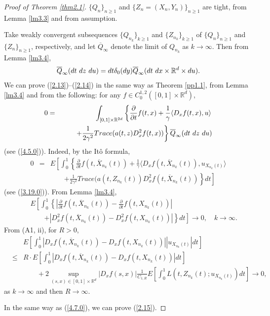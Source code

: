 \documentclass[12pt]{article}
\begin{document}
\begin{proof}[Proof of Theorem \ref{thm2.1}]
$\{Q_n\}_{n\ge 1}$ and $\{Z_n=(X_n, Y_n)\}_{n\ge 1}$ are tight,
from Lemma \ref{lm3.3} and  from assumption.


Take weakly convergent subsequences 
$\{Q_{n_k}\}_{k\ge 1}$ and 
$\{Z_{n_k}\}_{k\ge 1}$
of $\{Q_n \}_{n\ge 1}$ and $\{Z_n\}_{n\ge 1}$, respectively, and let $\overline Q_\infty$ denote the limit of $Q_{n_k} $ as $k\to\infty$.
Then from Lemma \ref{lm3.4},
\begin{equation}
\overline Q_\infty(dt\hbox{ }dz\hbox{ }du)=dt\delta_0(dy)\overline Q_\infty(dt\hbox{ }dx\times \mathbb{R}^d \times du).
\end{equation}
We can prove (\ref{2.13})--(\ref{2.14}) in the same way as Theorem \ref{pp1.1},
from Lemma \ref{lm3.4} and from the following:
for any $f\in C_0^{1,2}([0,1]\times \mathbb{R}^{d})$, 
\begin{eqnarray}\label{4.7}
0&=&\int_{[0,1]\times \mathbb{R}^{2d}} \left\{
\frac{\partial }{\partial t}f(t, x)+
\frac{1}{\gamma}\langle D_x f(t, x),u\rangle\right.\\
&&\qquad \left.
+\frac{1}{2\gamma^2}Trace (a(t, z)D_x^2f(t, x))\right\}
\overline Q_\infty(dt\hbox{ }dz\hbox{ }du)\nonumber
\end{eqnarray}
(see (\ref{4.5.0})).
Indeed,  by the It\^o formula, 
\begin{eqnarray}%
0&=&E\left[\int_0^1 \left\{
\frac{\partial }{\partial t}f(t, \overline X_{n_k}(t))+
\frac{1}{\gamma}\langle D_x f(t, \overline X_{n_k}(t)),u_{X_{n_k}(t)}\rangle\right.\right.\nonumber\\
&&\qquad\left.\left.+\frac{1}{2\gamma^2}Trace (a(t, Z_{n_k}(t))D_x^2f(t, \overline X_{n_k}(t))\right\}dt\right]\nonumber
\end{eqnarray}
(see (\ref{3.19.0})).
From Lemma \ref{lm3.4}, %
\begin{eqnarray}\label{4.10}
&&E\left[\int_0^1 \left\{
\left|\frac{\partial }{\partial t}f(t, \overline X_{n_k}(t)) -\frac{\partial }{\partial t}f(t,X_{n_k}(t))\right|
\right.\right.\\
&&\qquad \left.\left.
+\left|D_x^2f(t, \overline X_{n_k}(t))-D_x^2f(t, X_{n_k}(t))\right|\right\}
dt\right]\to 0,\quad k\to\infty.\nonumber
\end{eqnarray}
From (A1, ii), for $R>0$,
\begin{eqnarray}\label{4.11}
&&E\left[\int_0^1 
|D_x f(t, \overline X_{n_k}(t))-D_x f(t, X_{n_k}(t))||u_{X_{n_k}(t)}|dt\right]\\
& \le& R \cdot E\left[\int_0^1 |D_x f(t, \overline X_{n_k}(t))-D_x f(t, X_{n_k}(t))|dt\right]\nonumber\\
&&\qquad +2\sup_{(s,x)\in [0,1]\times \mathbb{R}^d}|D_x f(s,x)|\frac{1}{C_{1,R}
}
E\left[\int_0^1 L(t,Z_{n_k}(t);u_{X_{n_k}(t)})dt\right]
\to 0,\nonumber
\end{eqnarray}
as $k\to\infty$ and then $R\to\infty$.

In the same way as (\ref{4.7.0}), we can prove (\ref{2.15}).
\end{proof}
\end{document}

